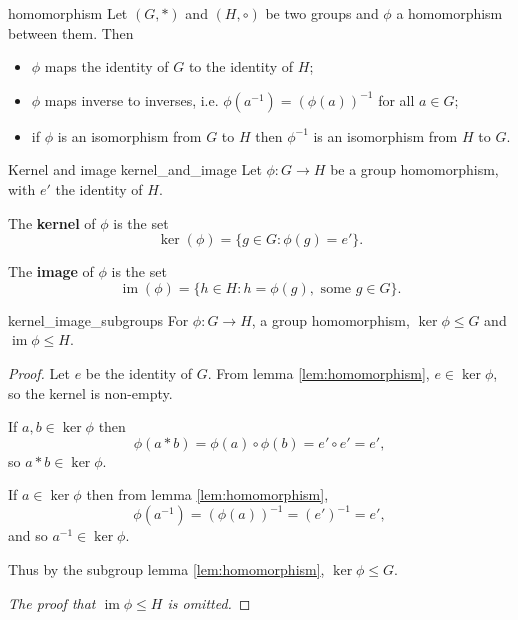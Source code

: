 \begin{lemma}{\cite{math2601_notes}}{homomorphism}
Let $(G, *)$ and $(H, \circ)$ be two groups and $\phi$ a homomorphism between them. Then
\begin{itemize}
	\item $\phi$ maps the identity of $G$ to the identity of $H$;
	\item $\phi$	 maps inverse to inverses, i.e. $\phi (a^{-1}) = (\phi(a))^{-1}$ for all $a \in G$;
	\item if $\phi$ is an isomorphism from $G$ to $H$ then $\phi^{-1}$ is an isomorphism from $H$ to $G$.
\end{itemize}
\end{lemma}

\begin{definition}{Kernel and image \cite{math2601_notes}}{kernel_and_image}
Let $\phi : G \to H$ be a group homomorphism, with $e'$ the identity of $H$.

The \textbf{kernel} of $\phi$ is the set
$$ \ker (\phi) = \{ g \in G : \phi (g) = e' \} . $$

The \textbf{image} of $\phi$ is the set
$$ \operatorname{im} (\phi) = \{ h \in H : h = \phi (g), \text{ some } g \in G \} . $$
\end{definition}

\begin{lemma}{\cite{math2601_notes}}{kernel_image_subgroups}
For $\phi : G \to H$, a group homomorphism, $\ker \phi \leq G$ and $\operatorname{im} \phi \leq H$.

\begin{proof}
Let $e$ be the identity of $G$. From lemma \ref{lem:homomorphism}, $e \in \ker \phi$, so the kernel is non-empty.

If $a, b \in \ker \phi$ then
$$ \phi (a * b) = \phi (a) \circ \phi (b) = e' \circ e' = e' , $$
so $a * b \in \ker \phi$.

If $a \in \ker \phi$ then from lemma \ref{lem:homomorphism},
$$ \phi (a^{-1}) = (\phi (a))^{-1} = (e')^{-1} = e' , $$
and so $a^{-1} \in \ker \phi$.

Thus by the subgroup lemma \ref{lem:homomorphism}, $\ker \phi \leq G$.

\textit{The proof that $\operatorname{im} \phi \leq H$ is omitted.}
\end{proof}
\end{lemma}

